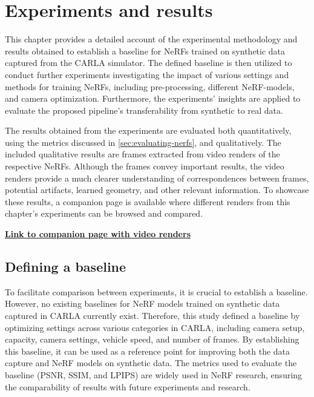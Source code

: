 \chapter{Experiments and results} \label{sec:experiments-and-results}
This chapter provides a detailed account of the experimental methodology and results obtained to establish a baseline for NeRFs trained on synthetic data captured from the CARLA simulator. The defined baseline is then utilized to conduct further experiments investigating the impact of various settings and methods for training NeRFs, including pre-processing, different NeRF-models, and camera optimization. Furthermore, the experiments’ insights are applied to evaluate the proposed pipeline’s transferability from synthetic to real data.

The results obtained from the experiments are evaluated both quantitatively, using the metrics discussed in \autoref{sec:evaluating-nerfs}, and qualitatively. The included qualitative results are frames extracted from video renders of the respective NeRFs. Although the frames convey important results, the video renders provide a much clearer understanding of correspondences between frames, potential artifacts, learned geometry, and other relevant information. To showcase these results, a companion page is available where different renders from this chapter's experiments can be browsed and compared.

\vspace{2mm} %
\noindent \textbf{\href{https://absorbing-peace-5f6.notion.site/NeRF-Renders-Master-thesis-34ff125e2200406588f002b36eeaacef}{Link to companion page with video renders}}

\section{Defining a baseline}

To facilitate comparison between experiments, it is crucial to establish a baseline. However, no existing baselines for NeRF models trained on synthetic data captured in CARLA currently exist. Therefore, this study defined a baseline by optimizing settings across various categories in CARLA, including camera setup, capacity, camera settings, vehicle speed, and number of frames. By establishing this baseline, it can be used as a reference point for improving both the data capture and NeRF models on synthetic data. The metrics used to evaluate the baseline (PSNR, SSIM, and LPIPS) are widely used in NeRF research, ensuring the comparability of results with future experiments and research.


